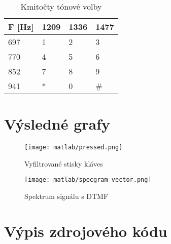 \documentclass[11pt, a4paper]{article}
\begin{document}
        \begin{table}[H]
            \centering
            \begin{tabular}{|l|l|l|l|}
                \hline
                F [Hz] & 1209 & 1336 & 1477 \\ \hline
                697 & 1 & 2 & 3 \\ \hline
                770 & 4 & 5 & 6 \\ \hline
                852 & 7 & 8 & 9 \\ \hline
                941 & * & 0 & \# \\ \hline
            \end{tabular}
            \caption{Kmitočty tónové volby}
            \label{tab:1}
        \end{table}
    
    \section{Výsledné grafy}
            
        \begin{figure}[H]
            \centering
            \texttt{[image: matlab/pressed.png]}
            \caption{Vyfiltrované stisky kláves}
            \label{fig:1}
        \end{figure}
        
        \begin{figure}[H]
            \centering
            \texttt{[image: matlab/specgram\_vector.png]}
            \caption{Spektrum signálu s DTMF}
            \label{fig:2}
        \end{figure}
    
    \section{Výpis zdrojového kódu}
    
\end{document}
